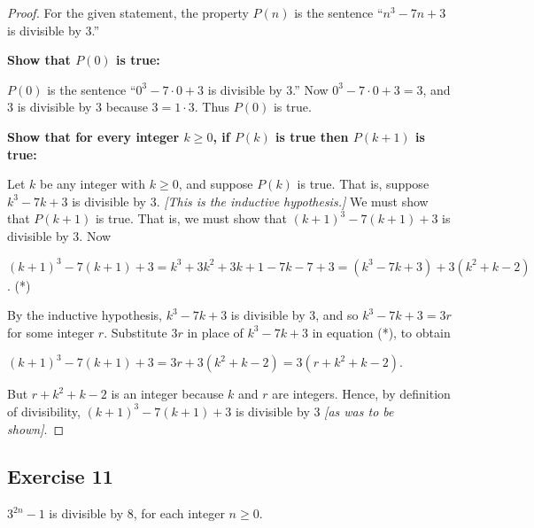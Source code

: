 \documentclass[14pt]{extarticle}
\begin{document}
\begin{proof}
For the given statement, the property $P(n)$ is the sentence “$n^3 - 7n + 3$ is divisible by 3.” 

{\bf Show that $P(0)$ is true:} 

$P(0)$ is the sentence “$0^3 - 7 \cdot 0 + 3$ is divisible by 3.” Now $0^3 - 7 \cdot 0 + 3 = 3$, and 3 is divisible by 3 because $3 = 1 \cdot 3$. Thus $P(0)$ is true. 

{\bf Show that for every integer $k \geq 0$, if $P(k)$ is true then $P(k + 1)$ is true:} 

Let $k$ be any integer with $k \geq 0$, and suppose $P(k)$ is true. That is, suppose $k^3 - 7k + 3$ is divisible by 3. {\it [This is the inductive hypothesis.]} We must show that $P(k + 1)$ is true. That is, we must show that $(k+1)^3 - 7(k+1) + 3$ is divisible by 3. Now 

$(k+1)^3 - 7(k+1) + 3 = k^3 + 3k^2 + 3k + 1 - 7k - 7 + 3 = (k^3 - 7k + 3) + 3(k^2 + k - 2)$. (*) 

By the inductive hypothesis, $k^3 - 7k + 3$ is divisible by 3, and so $k^3 - 7k + 3 = 3r$ for some integer $r$. Substitute $3r$ in place of $k^3 - 7k + 3$ in equation (*), to obtain 

$(k+1)^3 - 7(k+1) + 3 = 3r + 3(k^2 + k - 2) = 3(r + k^2 + k - 2)$. 

But $r + k^2 + k - 2$ is an integer because $k$ and $r$ are integers. Hence, by definition of divisibility, $(k+1)^3 - 7(k+1) + 3$ is divisible by 3 {\it [as was to be shown]}.
\end{proof}

\subsection{Exercise 11}
$3^{2n} - 1$ is divisible by 8, for each integer $n \geq 0$.
\end{document}
